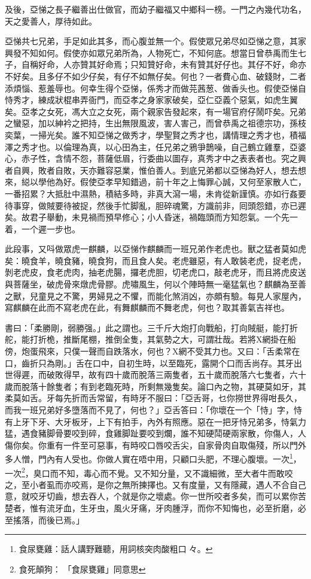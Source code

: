 \documentclass[a5paper, 12pt, openany]{book} %
\begin{document}
	及後，亞悌之長子繼善出仕做官，而幼子繼福又中鄉科一榜。一門之內幾代功名，天之愛善人，厚待如此。

	亞悌共七兄弟，手足如此其多，而心腹並無一个。假使眾兄弟尽如亞悌之意，其家興發不知如何。假使亦如眾兄弟所為，人物死亡，不知何底。想當日曾恭禹而生七子，自稱好命，人亦贊其好命焉；只知贊好命，未有贊其好仔也。其仔不好，命亦不好矣。且多仔不如少仔矣，有仔不如無仔矣。何也？一者費心血、破錢財，二者添煩惱、惹羞辱也。何幸生得个亞悌，係秀才而做芫茜葱、做香头也。假使亞悌自恃秀才，練成狀棍串弄衙門，而亞孝之身家家破矣，亞仁亞義个惡氣，如虎生翼矣。亞孝之女死，馮大立之女死，兩个親家告發起來，有一場官府仔鬧吓矣。兄弟之蠻惡，加以紳衿之把持，生出無限風波，害人害己，而曾恭禹之祖德宗功，孫枝奕葉，一掃光矣。誰不知亞悌之做秀才，學聖賢之秀才也，講情理之秀才也，積福澤之秀才也。以倫理為真，以心田為主，任兄弟之鴉爭鵲噪，自己鶴立雞羣，亞婆心，赤子性，含情不怨，菩薩低眉，行委曲以圖存，真秀才中之表表者也。究之興者自興，敗者自敗，天亦難容惡業，惟伯善人。到底兄弟都以亞悌為好人，想去想來，縂以學他為好。假使亞孝早知錯過，前十年之上悔罪心誠，又何至家散人亡，一番招累？大抵肚中濕熱，積結多時，非真大瀉一場，未肯從新謹慎。亦如行姦要待事穿，做賊要待被捉，然後手忙脚亂，胆碎魂驚，方識前非，囘頭怨錯，亦已遲矣。故君子舉動，未見禍而預早修心；小人昏迷，禍臨頭而方知怨氣。一个先一着，一个遲一步也。

	此段事，又呌做眾虎一麒麟，以亞悌作麒麟而一班兄弟作老虎也。獸之猛者莫如虎矣：曉食羊，曉食豬，曉食狗，而且食人矣。老虎雖惡，有人敢裝老虎，捉老虎，剝老虎皮，食老虎肉，抽老虎腸，攞老虎胆，切老虎口，敲老虎牙，而且將虎皮送與菩薩坐，破虎骨來燉虎骨膠。虎嘯風生，何以个陣時無一毫猛氣也？麒麟為至善之獸，兒童見之不驚，男婦見之不懼，而能化煞消凶，亦頗有驗。每見人家屋內，寫麒麟在此而不寫老虎在此，有舞麒麟而不舞老虎，何也？取其善氣吉祥也。

	書曰：「柔勝剛，弱勝强。」此之謂也。三千斤大炮打向戰船，打向賊艇，能打折舵，能打折桅，推斷尾棚，推倒全隻，其氣勢之大，可謂壯哉。若將X網掛在船傍，炮蛋飛來，只僕一聲而自跌落水，何也？X網不受其力也。又曰：「舌柔常在口，齒折只為剛。」舌在口中，自初生時，以至臨死，露開个口而舌尚存。其牙出世得遲，而破敗得早，故有四十歲而脫落三兩隻者，五十歲而脫落六七隻者，六十歲而脫落十餘隻者；有到老臨死時，所剩無幾隻矣。論口內之物，其硬莫如牙，其柔莫如舌。牙每先折而舌常留，有時牙不服曰：「亞舌哥，乜你撈世界得咁長久，而我一班兄弟好多墮落而不見了，何也？」亞舌答曰：「你壞在一个「恃」字，恃有上牙下牙、大牙板牙，上下有拍手，內外有照應。惡在一把牙恃兄弟多，恃氣力猛，遇食豬脚骨要咬到碎，食雞脚趾要咬到爛，誰不知硬鬦硬兩家散，你傷人，人傷你矣。你重有一件至可惡事，有時咬口唇咬舌尖，自家骨肉自取傷殘，所以門外多人憎，門內有人受也。你做人實在唔中用，只顧口头肥，不理心腹壞。一次\footnote{食尿甕雞：話人講野難聽，用詞核突肉酸粗口々。}，一次\footnote{食死顛狗：「食尿甕雞」同意思}，臭口而不知，毒心而不覺。又不知分量，又不識細微，至大者牛而敢咬之，至小者虱而亦咬焉，是你之無所揀擇也。又有度量，又有隱藏，遇人不合自己意，就咬牙切齒，想去吞人，个就是你之壞處。你一世所咬者多矣，而可以累你苦楚者，惟有流牙血，生牙虫，風火牙痛，牙肉腫浮，而你不知悔也，必至折磨，必至搖落，而後已焉。」
\end{document}
